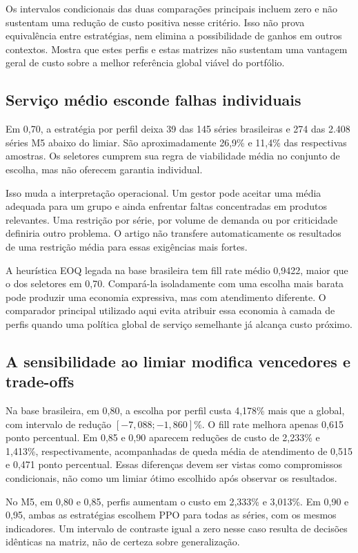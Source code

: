 \documentclass[preprint,12pt]{elsarticle}
\begin{document}
Os intervalos condicionais das duas comparações principais incluem zero e não sustentam uma redução de custo positiva nesse critério. Isso não prova equivalência entre estratégias, nem elimina a possibilidade de ganhos em outros contextos. Mostra que estes perfis e estas matrizes não sustentam uma vantagem geral de custo sobre a melhor referência global viável do portfólio.

\subsection{Serviço médio esconde falhas individuais}
Em 0,70, a estratégia por perfil deixa 39 das 145 séries brasileiras e 274 das 2.408 séries M5 abaixo do limiar. São aproximadamente 26,9\% e 11,4\% das respectivas amostras. Os seletores cumprem sua regra de viabilidade média no conjunto de escolha, mas não oferecem garantia individual.

Isso muda a interpretação operacional. Um gestor pode aceitar uma média adequada para um grupo e ainda enfrentar faltas concentradas em produtos relevantes. Uma restrição por série, por volume de demanda ou por criticidade definiria outro problema. O artigo não transfere automaticamente os resultados de uma restrição média para essas exigências mais fortes.

A heurística EOQ legada na base brasileira tem fill rate médio 0,9422, maior que o dos seletores em 0,70. Compará-la isoladamente com uma escolha mais barata pode produzir uma economia expressiva, mas com atendimento diferente. O comparador principal utilizado aqui evita atribuir essa economia à camada de perfis quando uma política global de serviço semelhante já alcança custo próximo.

\subsection{A sensibilidade ao limiar modifica vencedores e trade-offs}
Na base brasileira, em 0,80, a escolha por perfil custa 4,178\% mais que a global, com intervalo de redução $[-7{,}088;-1{,}860]\%$. O fill rate melhora apenas 0,615 ponto percentual. Em 0,85 e 0,90 aparecem reduções de custo de 2,233\% e 1,413\%, respectivamente, acompanhadas de queda média de atendimento de 0,515 e 0,471 ponto percentual. Essas diferenças devem ser vistas como compromissos condicionais, não como um limiar ótimo escolhido após observar os resultados.

No M5, em 0,80 e 0,85, perfis aumentam o custo em 2,333\% e 3,013\%. Em 0,90 e 0,95, ambas as estratégias escolhem PPO para todas as séries, com os mesmos indicadores. Um intervalo de contraste igual a zero nesse caso resulta de decisões idênticas na matriz, não de certeza sobre generalização.
\end{document}
